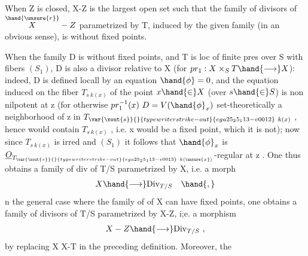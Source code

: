 
 When Z is closed, X-Z is the largest open set
such that the family of divisors of $\overset{\hand{\unsure{r}}}{X}-Z$ parametrized by T, induced by the
given family (in an obvious sense), is without fixed points.

When the family D is without fixed points, and T is  loc of finite pres
over S with fibers $(S_1)$, D is also a  divisor
relative to X (for $pr_1 : X\times_S T \hand{\longrightarrow} X$): indeed, D is defined locall
 by an equation  $\hand{\phi} = 0$, and the equation induced on the fiber
$T_{s\ k(x)}$ of the point $x\hand{\in} X$ (over $s\hand{\in} S$) is non 
nilpotent at z (for otherwise $pr_1^{-1}(x)\ D = V(\hand{\phi}_x)$   set-theoretically
a neighborhood of z in $T_{\var{\xout{s}}{}{typewriter strike-out}{ega25_25_113-v0012}\ k(x)}$ , hence would contain $T_{s\ k(x)}$ , i.e.
x would be a fixed point, which it is not); now since $T_{s\ k(x)}$ is irred and $(S_1)$
it follows that $\hand{\phi}_x$ is $\underline{O}_{T_{\var{\xout{s}}{}{typewriter strike-out}{ega25_25_113-v0013}\ k(\unsure{x})}}$-regular at z . One thus obtains
 a family of div of T/S parametrized by X, i.e. a morph
\[ X \hand{\longrightarrow} \mathrm{Div}_{T/S} \quad \hand{,} \]
n the general case where the family of  of X can have fixed
points, one obtains a family of divisors of T/S parametrized by X-Z,
i;e. a morphism
\[ X - Z \hand{\longrightarrow} \mathrm{Div}_{T/S} \ , \]
by replacing X  X-T in the preceding definition. Moreover, the

